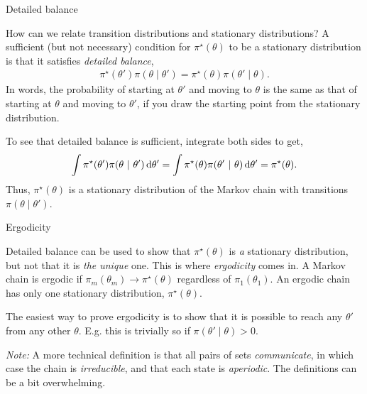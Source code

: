 \documentclass[aspectratio=169]{beamer}
\begin{document}
\begin{frame}[t,allowframebreaks]{Detailed balance}\label{detailed-balance}

How can we relate transition distributions and stationary distributions?
A sufficient (but not necessary) condition for \(\pi^\star(\theta)\) to
be a stationary distribution is that it satisfies \emph{detailed
balance}, \begin{align*}
\pi^\star(\theta') \pi(\theta \mid \theta') = \pi^\star(\theta) \pi(\theta' \mid \theta).
\end{align*} In words, the probability of starting at \(\theta'\) and
moving to \(\theta\) is the same as that of starting at \(\theta\) and
moving to \(\theta'\), if you draw the starting point from the
stationary distribution.

To see that detailed balance is sufficient, integrate both sides to get,
\begin{align*}
\int \pi^\star(\theta') \pi(\theta ~\vert~ \theta') \mathop{}\!\mathrm{d} \theta' = \int \pi^\star(\theta) \pi(\theta' ~\vert~ \theta) \mathop{}\!\mathrm{d} \theta' = \pi^\star(\theta).
\end{align*} Thus, \(\pi^\star(\theta)\) is a stationary distribution of
the Markov chain with transitions \(\pi(\theta \mid \theta')\).

\end{frame}

\begin{frame}[t,allowframebreaks]{Ergodicity}\label{ergodicity}

Detailed balance can be used to show that \(\pi^\star(\theta)\) is
\emph{a} stationary distribution, but not that it is \emph{the unique}
one. This is where \emph{ergodicity} comes in. A Markov chain is ergodic
if \(\pi_m(\theta_m) \to \pi^\star(\theta)\) regardless of
\(\pi_1(\theta_1)\). An ergodic chain has only one stationary
distribution, \(\pi^\star(\theta)\).

The easiest way to prove ergodicity is to show that it is possible to
reach any \(\theta'\) from any other \(\theta\). E.g. this is trivially
so if \(\pi(\theta' \mid \theta) > 0\).

\textit{Note:} A more technical definition is that all pairs of
sets \emph{communicate}, in which case the chain is \emph{irreducible},
and that each state is \emph{aperiodic}. The definitions can be a bit
overwhelming. 
\end{frame}
\end{document}
